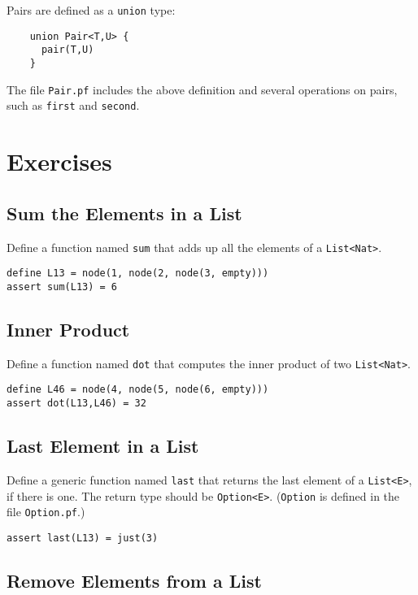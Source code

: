 \documentclass[12pt]{article}
\begin{document}
Pairs are defined as a \texttt{union} type:

\begin{verbatim}
    union Pair<T,U> {
      pair(T,U)
    }
\end{verbatim}

The file \texttt{Pair.pf} includes the above definition and several
operations on pairs, such as \texttt{first} and \texttt{second}.

\section{Exercises}

\subsection{Sum the Elements in a List}

Define a function named \texttt{sum} that adds up all the elements of a \texttt{List<Nat>}.

\begin{verbatim}
define L13 = node(1, node(2, node(3, empty)))
assert sum(L13) = 6
\end{verbatim}

\subsection{Inner Product}

Define a function named \texttt{dot} that computes the inner product of two \texttt{List<Nat>}.

\begin{verbatim}
define L46 = node(4, node(5, node(6, empty)))
assert dot(L13,L46) = 32
\end{verbatim}

\subsection{Last Element in a List}

Define a generic function named \texttt{last} that returns the last element
of a \texttt{List<E>}, if there is one. The return type should be \texttt{Option<E>}.
(\texttt{Option} is defined in the file \texttt{Option.pf}.)

\begin{verbatim}
assert last(L13) = just(3)
\end{verbatim}

\subsection{Remove Elements from a List}
\end{document}
